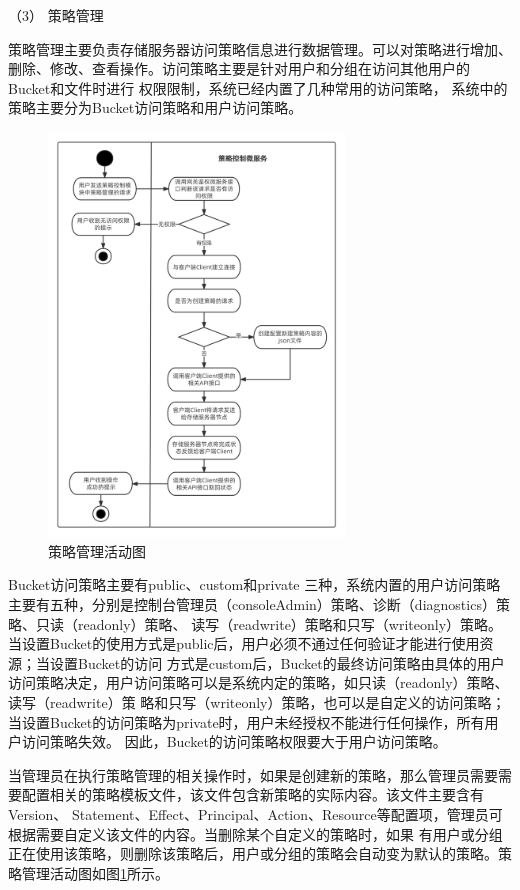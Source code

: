 （3） 策略管理

策略管理主要负责存储服务器访问策略信息进行数据管理。可以对策略进行增加、删除、修改、查看操作。访问策略主要是针对用户和分组在访问其他用户的Bucket和文件时进行
权限限制，系统已经内置了几种常用的访问策略， 系统中的策略主要分为Bucket访问策略和用户访问策略。
\begin{figure}[htb]
    \centering
    \includegraphics[width=0.7\textwidth]{my_figures/chapter4/策略管理活动图.png}
    \caption{策略管理活动图}
    \label{fig:策略管理活动图}
\end{figure} 
Bucket访问策略主要有public、custom和private
三种，系统内置的用户访问策略主要有五种，分别是控制台管理员（consoleAdmin）策略、诊断（diagnostics）策略、只读（readonly）策略、
读写（readwrite）策略和只写（writeonly）策略。当设置Bucket的使用方式是public后，用户必须不通过任何验证才能进行使用资源；当设置Bucket的访问
方式是custom后，Bucket的最终访问策略由具体的用户访问策略决定，用户访问策略可以是系统内定的策略，如只读（readonly）策略、读写（readwrite）策
略和只写（writeonly）策略，也可以是自定义的访问策略；当设置Bucket的访问策略为private时，用户未经授权不能进行任何操作，所有用户访问策略失效。
因此，Bucket的访问策略权限要大于用户访问策略。

当管理员在执行策略管理的相关操作时，如果是创建新的策略，那么管理员需要需要配置相关的策略模板文件，该文件包含新策略的实际内容。该文件主要含有Version、
Statement、Effect、Principal、Action、Resource等配置项，管理员可根据需要自定义该文件的内容。当删除某个自定义的策略时，如果
有用户或分组正在使用该策略，则删除该策略后，用户或分组的策略会自动变为默认的策略。策略管理活动图如图\ref{fig:策略管理活动图}所示。

